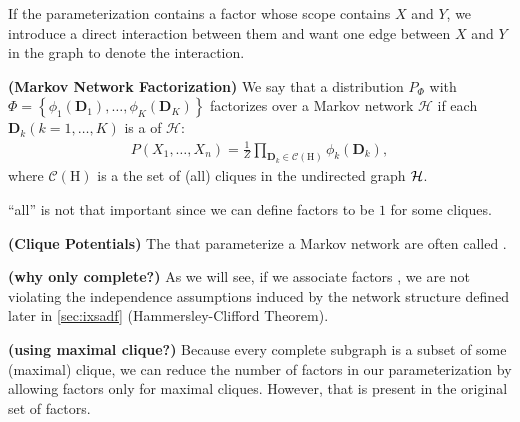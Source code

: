 \documentclass{article}
\newcommand{\bfs}[1]{\textbf{({#1}) }}
\begin{document}
If the parameterization contains a factor whose scope contains $X$ and $Y$, we introduce a direct interaction between them and want one edge between $X$ and $Y$ in the graph to denote the interaction.
\begin{defa}\bfs{Markov Network Factorization}\label{def:Markov_fac}
 We say that a distribution $P_{\Phi}$ with $\Phi=\left\{\phi_{1}\left(\boldsymbol{D}_{1}\right), \ldots, \phi_{K}\left(\boldsymbol{D}_{K}\right)\right\}$ factorizes over a Markov network $\mathcal{H}$ if each $\boldsymbol{D}_{k}(k=1, \ldots, K)$ is a  of $\mathcal{H}$:
 \begin{align}
     P\left(X_{1}, \ldots, X_{n}\right)=\frac{1}{Z} \prod_{\boldsymbol{D}_k \in \mathcal{C}(\mathrm{H})} \phi_{k}\left(\boldsymbol{D}_{k}\right), \label{eq:cli_fac}
 \end{align}
 where $\mathcal{C}(\mathrm{H})$ is a the set of (all) cliques in the undirected graph $\mathcal{H}$.
\end{defa}
\begin{rema}
 ``all'' is not that important since we can define factors to be $1$ for some cliques.
\end{rema}
\begin{defa}\bfs{Clique Potentials}
 The  that parameterize a Markov network are often called .
\end{defa}
\begin{rema}\bfs{why only complete?}
As we will see, if we associate factors , we are not violating the independence assumptions induced by the network structure defined later in \cref{sec:ixsadf} (Hammersley-Clifford Theorem).
\end{rema}
\begin{rema}\bfs{using maximal clique?}
Because every complete subgraph is a subset of some (maximal) clique, we can reduce the number of factors in our parameterization by allowing factors only for maximal cliques. However,  that is present in the original set of factors.
\end{rema}
\end{document}
